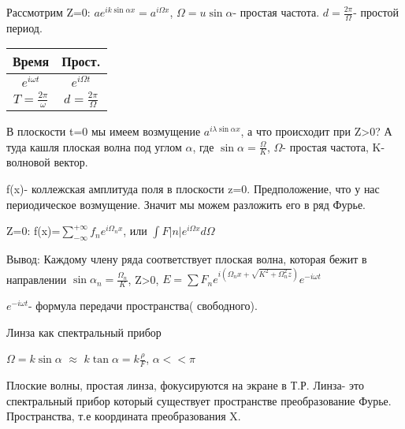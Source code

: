 \documentclass[12pt]{article}
\begin{document}
Рассмотрим Z=0: $ae^{ik\sin\alpha x}=a^{i\Omega x}$, $\Omega=u\sin\alpha$- простая частота. $d=\frac{2\pi}{\Omega}$- простой период. 

\begin{tabular}{c|c}
Время  & Прост. \\ \hline
$e^{i\omega t}$ & $e^{i\Omega t}$ \\ 
$T=\frac{2\pi}{\omega}$ & $d=\frac{2\pi}{\Omega}$ \\
\end{tabular}

В плоскости t=0  мы имеем возмущение $a^{i\lambda\sin\alpha x}$, а что происходит при Z>0? А туда кашля плоская волна под углом $\alpha$, где $\sin\alpha=\frac{\Omega}{K}$, $\Omega$- простая частота, K- волновой вектор.


f(x)- коллежская амплитуда поля в плоскости z=0.
Предположение, что у нас периодическое возмущение. Значит мы можем разложить его в ряд Фурье.

Z=0: f(x)=$\sum\limits_{-\infty}^{+\infty} f_ne^{i\Omega_n x}$, или $\int F|n|e^{i\Omega x}d\Omega$

Вывод: Каждому члену ряда  соответствует плоская волна, которая бежит в направлении $\sin\alpha_n=\frac{\Omega_n}{K}$, Z>0, $E=\sum F_ne^{i(\Omega_nx+\sqrt{K^2+\Omega^2_nz})}e^{-i\omega t}$

$e^{-i\omega t}$- формула передачи пространства( свободного).

\hspace{4cm}Линза как спектральный прибор

$\Omega=k\sin\alpha$ $\approx$ $k\tan\alpha=k \frac{\rho}{F}$, $\alpha<<\pi$

Плоские волны, простая линза, фокусируются на экране в Т.Р.
Линза- это спектральный прибор который существует пространстве преобразование Фурье.
Пространства, т.е координата преобразования  X.  
\end{document}
